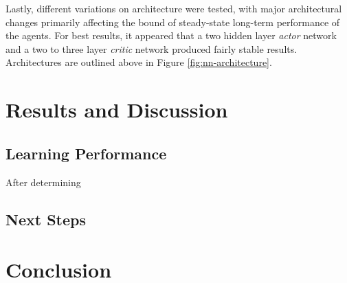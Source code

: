 \documentclass[11pt]{article}
\begin{document}
 \FloatBarrier
 
 Lastly, different variations on architecture were tested, with major architectural changes primarily affecting the bound of steady-state long-term performance of the agents. For best results, it appeared that a two hidden layer \textit{actor} network and a two to three layer \textit{critic} network produced fairly stable results. Architectures are outlined above in Figure \ref{fig:nn-architecture}.
 

\section{Results and Discussion}

\subsection{Learning Performance}

After determining 

\FloatBarrier

\begin{figure}[!ht]
	\centering
	\caption{}
	\label{fig:d4pg-results}
\end{figure}

\FloatBarrier

\subsection{Next Steps}

\section{Conclusion}



\end{document}

